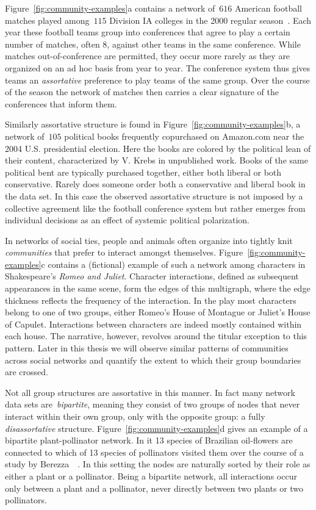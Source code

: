 Figure~\ref{fig:community-examples}a contains a network of~$616$ American football matches played among~$115$ Division IA colleges in the 2000 regular season~\cite{GN02}. Each year these football teams group into conferences that agree to play a certain number of matches, often 8, against other teams in the same conference. While matches out-of-conference are permitted, they occur more rarely as they are organized on an ad hoc basis from year to year. The conference system thus gives teams an \emph{assortative} preference to play teams of the same group. Over the course of the season the network of matches then carries a clear signature of the conferences that inform them.

Similarly assortative structure is found in Figure~\ref{fig:community-examples}b, a network of~$105$ political books frequently copurchased on Amazon.com near the 2004 U.S. presidential election. Here the books are colored by the political lean of their content, characterized by V. Krebs in unpublished work. Books of the same political bent are typically purchased together, either both liberal or both conservative. Rarely does someone order both a conservative and liberal book in the data set. In this case the observed assortative structure is not imposed by a collective agreement like the football conference system but rather emerges from individual decisions as an effect of systemic political polarization. 

In networks of social ties, people and animals often organize into tightly knit \emph{communities} that prefer to interact amongst themselves. Figure~\ref{fig:community-examples}c contains a (fictional) example of such a network among characters in Shakespeare's \textit{Romeo and Juliet}. Character interactions, defined as subsequent appearances in the same scene, form the edges of this multigraph, where the edge thickness reflects the frequency of the interaction. In the play most characters belong to one of two groups, either Romeo's House of Montague or Juliet's House of Capulet. Interactions between characters are indeed mostly contained within each house. The narrative, however, revolves around the titular exception to this pattern. Later in this thesis we will observe similar patterns of communities across social networks and quantify the extent to which their group boundaries are crossed.

Not all group structures are assortative in this manner. In fact many network data sets are~\emph{bipartite}, meaning they consist of two groups of nodes that never interact within their own group, only with the opposite group: a fully \emph{disassortative} structure. Figure~\ref{fig:community-examples}d gives an example of a bipartite plant-pollinator network. In it 13 species of Brazilian oil-flowers are connected to which of 13 species of pollinators visited them over the course of a study by Berezza~\etal~\cite{BMM09}. In this setting the nodes are naturally sorted by their role as either a plant or a pollinator. Being a bipartite network, all interactions occur only between a plant and a pollinator, never directly between two plants or two pollinators. 

